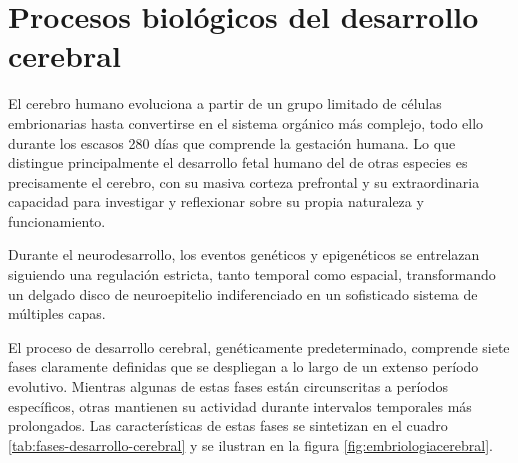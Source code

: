 \documentclass[11pt,letterpaper]{report}
\begin{document}
\section{Procesos biológicos del desarrollo cerebral}
El cerebro humano evoluciona a partir de un grupo limitado de células
embrionarias hasta convertirse en el sistema orgánico más complejo, todo ello
durante los escasos 280 días que comprende la gestación humana. Lo que 
distingue principalmente el desarrollo fetal humano del de otras especies es 
precisamente el cerebro, con su masiva corteza prefrontal y su extraordinaria 
capacidad para investigar y reflexionar sobre su propia naturaleza y 
funcionamiento. \cite{Polin124}

Durante el neurodesarrollo, los eventos genéticos y epigenéticos se entrelazan 
siguiendo una regulación estricta, tanto temporal como espacial, transformando
un delgado disco de neuroepitelio indiferenciado en un sofisticado sistema de
múltiples capas. \cite{Polin124}

El proceso de desarrollo cerebral, genéticamente predeterminado, comprende
siete fases claramente definidas que se despliegan a lo largo de un extenso
período evolutivo. \cite{Kolb7} Mientras algunas de estas fases están
circunscritas a períodos específicos, otras mantienen su actividad durante
intervalos temporales más prolongados. Las características de estas fases se
sintetizan en el cuadro \ref{tab:fases-desarrollo-cerebral} y se ilustran en la
figura \ref{fig:embriologiacerebral}. 

\begin{table}[htbp]
\caption{Siete fases del desarrollo cerebral}
\label{tab:fases-desarrollo-cerebral}
\end{table}
\end{document}
